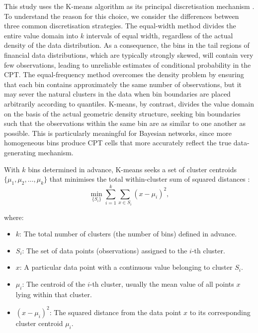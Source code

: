 This study uses the K-means algorithm as its principal discretisation mechanism \cite{liu2024credit}. To understand the reason for this choice, we consider the differences between three common discretisation strategies. The equal-width method divides the entire value domain into $k$ intervals of equal width, regardless of the actual density of the data distribution. As a consequence, the bins in the tail regions of financial data distributions, which are typically strongly skewed, will contain very few observations, leading to unreliable estimates of conditional probability in the CPT. The equal-frequency method overcomes the density problem by ensuring that each bin contains approximately the same number of observations, but it may sever the natural clusters in the data when bin boundaries are placed arbitrarily according to quantiles. K-means, by contrast, divides the value domain on the basis of the actual geometric density structure, seeking bin boundaries such that the observations within the same bin are as similar to one another as possible. This is particularly meaningful for Bayesian networks, since more homogeneous bins produce CPT cells that more accurately reflect the true data-generating mechanism.

With $k$ bins determined in advance, K-means seeks a set of cluster centroids $\{\mu_1, \mu_2, \dots, \mu_k\}$ that minimises the total within-cluster sum of squared distances \cite{macqueen1967methods}:
\begin{equation}
    \label{eq: 3.3}
    \min_{\{S_i\}} \sum_{i=1}^{k} \sum_{x \in S_i} (x - \mu_i)^2,
\end{equation}

\noindent
where:
\begin{itemize}
    \item $k$: The total number of clusters (the number of bins) defined in advance.
    \item $S_i$: The set of data points (observations) assigned to the $i$-th cluster.
    \item $x$: A particular data point with a continuous value belonging to cluster $S_i$.
    \item $\mu_i$: The centroid of the $i$-th cluster, usually the mean value of all points $x$ lying within that cluster.
    \item $(x - \mu_i)^2$: The squared distance from the data point $x$ to its corresponding cluster centroid $\mu_i$.
\end{itemize}

